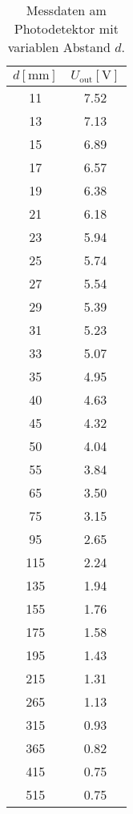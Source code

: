 \begin{table}
    \centering
    \caption{Messdaten am Photodetektor mit variablen Abstand $d$.}
    \label{tab:3}
    \begin{tabular}{c c}
        \toprule
        $d [\si{\milli\meter}]$ & $U_{\text{out}} [\si{\volt}]$ \\
        \midrule
        11      &   7.52  \\
        13      &   7.13 \\   
        15      &    6.89 \\ 
        17      &    6.57 \\ 
        19      &    6.38 \\ 
        21      &    6.18 \\ 
        23      &    5.94 \\ 
        25      &    5.74 \\ 
        27      &    5.54 \\ 
        29      &    5.39 \\ 
        31      &    5.23 \\ 
        33      &    5.07 \\ 
        35      &    4.95 \\ 
        40      &    4.63 \\ 
        45      &    4.32 \\ 
        50      &    4.04 \\ 
        55      &    3.84 \\ 
        65      &    3.50 \\ 
        75      &    3.15 \\ 
        95      &    2.65 \\ 
        115     &    2.24 \\ 
        135     &    1.94 \\ 
        155     &    1.76 \\ 
        175     &    1.58 \\ 
        195     &    1.43 \\ 
        215     &    1.31 \\ 
        265     &    1.13 \\ 
        315     &    0.93 \\ 
        365     &    0.82 \\ 
        415     &    0.75 \\ 
        515     &    0.75 \\            
        \end{tabular}
\end{table}